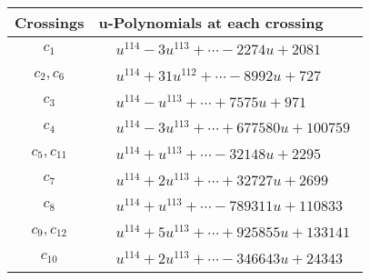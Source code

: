 \documentclass[1p]{elsarticle_modified}
\theoremstyle{definition}
\begin{document}
\begin{tabular}{m{50pt}|m{274pt}}
Crossings & \hspace{64pt}u-Polynomials at each crossing \\
\hline $$\begin{aligned}c_{1}\end{aligned}$$&$\begin{aligned}
&u^{114}-3 u^{113}+\cdots-2274 u+2081
\end{aligned}$\\
\hline $$\begin{aligned}c_{2},c_{6}\end{aligned}$$&$\begin{aligned}
&u^{114}+31 u^{112}+\cdots-8992 u+727
\end{aligned}$\\
\hline $$\begin{aligned}c_{3}\end{aligned}$$&$\begin{aligned}
&u^{114}- u^{113}+\cdots+7575 u+971
\end{aligned}$\\
\hline $$\begin{aligned}c_{4}\end{aligned}$$&$\begin{aligned}
&u^{114}-3 u^{113}+\cdots+677580 u+100759
\end{aligned}$\\
\hline $$\begin{aligned}c_{5},c_{11}\end{aligned}$$&$\begin{aligned}
&u^{114}+u^{113}+\cdots-32148 u+2295
\end{aligned}$\\
\hline $$\begin{aligned}c_{7}\end{aligned}$$&$\begin{aligned}
&u^{114}+2 u^{113}+\cdots+32727 u+2699
\end{aligned}$\\
\hline $$\begin{aligned}c_{8}\end{aligned}$$&$\begin{aligned}
&u^{114}+u^{113}+\cdots-789311 u+110833
\end{aligned}$\\
\hline $$\begin{aligned}c_{9},c_{12}\end{aligned}$$&$\begin{aligned}
&u^{114}+5 u^{113}+\cdots+925855 u+133141
\end{aligned}$\\
\hline $$\begin{aligned}c_{10}\end{aligned}$$&$\begin{aligned}
&u^{114}+2 u^{113}+\cdots-346643 u+24343
\end{aligned}$\\
\hline
\end{tabular}\\~\\
\end{document}
